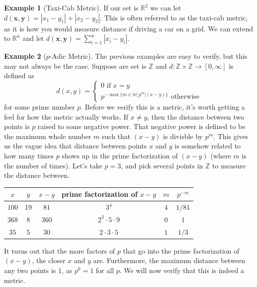 \documentclass{article}
\newcommand{\N}{\mathbb{N}}
\newcommand{\R}{\mathbb{R}}
\newcommand{\Z}{\mathbb{Z}}
\theoremstyle{definition}
\newtheorem{example}{Example}[section]
\begin{document}
\begin{example}[Taxi-Cab Metric]
If our set is $ \R^2 $ we can let $ d(\mathbf{x},\mathbf{y})=|x_1-y_1|+|x_2-y_2| $. This is often referred to as the taxi-cab metric, as it is how you would measure distance if driving a car on a grid. We can extend to $ \R^n $ and let $ d(\mathbf{x},\mathbf{y})=\sum_{i=1}^{n}|x_i-y_i| $. 
\end{example}
\begin{example}[$ p $-Adic Metric]
The previous examples are easy to verify, but this may not always be the case. Suppose are set is $ \Z $ and $ d:\Z\times\Z\to[0,\infty] $ is defined as $$ d(x,y)=\begin{cases}
0\text{ if }x=y\\p^{-\max\{m\in\N|\ p^m|(x-y) \}}\text{ otherwise}
\end{cases}$$ for some prime number $ p $. Before we verify this is a metric, it's worth getting a feel for how the metric actually works. If $ x\neq y $, then the distance between two points is $ p $ raised to some negative power. That negative power is defined to be the maximum whole number $ m $ such that $ (x-y) $ is divisble by $ p^m $. This gives us the vague idea that distance between points $ x $ and $ y $ is somehow related to how many times $ p $ shows up in the prime factorization of $ (x-y) $ (where $ m $ is the number of times). Let's take $ p=3 $, and pick several points in $ \Z $ to measure the distance between.    
\begin{center}
\begin{tabular}{cccccc}
	$ x $ & $ y $ & $ x-y $ & prime factorization of $ x-y $ & $ m $ & $ p^{-m} $ \\ \hline
	$ 100 $& 19  &  $ 81 $   &          $ 3^4 $                  &  $ 4 $  &     $ 1/81 $                  \\
$ 368 $	& 8  &  $ 360 $   &            $ 2^3\cdot5\cdot9 $                &  $ 0 $  &  $ 1 $                     \\
$ 35 $	& $ 5 $  &  $ 30 $   &  $ 2\cdot 3\cdot 5 $                           &      $ 1 $ & $ 1/3 $                 
\end{tabular}
\end{center}
It turns out that the more factors of $ p $ that go into the prime factorization of $ (x-y)$, the closer $ x $ and $ y $ are. Furthermore, the maximum distance between any two points is $ 1 $, as $ p^0=1 $ for all $ p $. We will now verify that this is indeed a metric. 
\begin{enumerate}

\end{enumerate}
\end{example}
\end{document}
